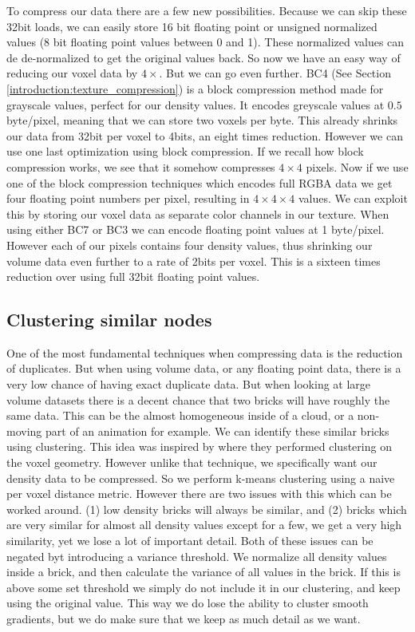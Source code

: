 To compress our data there are a few new possibilities. Because we can skip these 32bit loads, we can easily store 16 bit floating point or unsigned normalized values (8 bit floating point values between 0 and 1). These normalized values can de de-normalized to get the original values back. So now we have an easy way of reducing our voxel data by $4\times$. But we can go even further. BC4 (See Section \ref{introduction:texture_compression}) is a block compression method made for grayscale values, perfect for our density values. It encodes greyscale values at $0.5$ byte/pixel, meaning that we can store two voxels per byte. This already shrinks our data from 32bit per voxel to 4bits, an eight times reduction. However we can use one last optimization using block compression. If we recall how block compression works, we see that it somehow compresses $4\times 4$ pixels. Now if we use one of the block compression techniques which encodes full RGBA data we get four floating point numbers per pixel, resulting in $4 \times 4 \times 4$ values. We can exploit this by storing our voxel data as separate color channels in our texture. When using either BC7 or BC3 we can encode floating point values at 1 byte/pixel. However each of our pixels contains four density values, thus shrinking our volume data even further to a rate of 2bits per voxel. This is a sixteen times reduction over using full 32bit floating point values.

\subsection{Clustering similar nodes} \label{approach:clustering_similar_nodes}
One of the most fundamental techniques when compressing data is the reduction of duplicates. But when using volume data, or any floating point data, there is a very low chance of having exact duplicate data. But when looking at large volume datasets there is a decent chance that two bricks will have roughly the same data. This can be the almost homogeneous inside of a cloud, or a non-moving part of an animation for example. We can identify these similar bricks using clustering. This idea was inspired by \cite{van2020lossy} where they performed clustering on the voxel geometry. However unlike that technique, we specifically want our density data to be compressed. So we perform k-means clustering using a naive per voxel distance metric. However there are two issues with this which can be worked around. (1) low density bricks will always be similar, and (2) bricks which are very similar for almost all density values except for a few, we get a very high similarity, yet we lose a lot of important detail. Both of these issues can be negated byt introducing a variance threshold. We normalize all density values inside a brick, and then calculate the variance of all values in the brick. If this is above some set threshold we simply do not include it in our clustering, and keep using the original value. This way we do lose the ability to cluster smooth gradients, but we do make sure that we keep as much detail as we want.